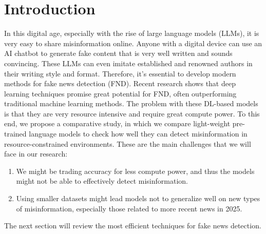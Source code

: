 \documentclass{article}
\begin{document}
\section{Introduction}
In this digital age, especially with the rise of large language models (LLMs), it is very easy to share misinformation online. Anyone with a digital device can use an AI chatbot to generate fake content that is very well written and sounds convincing. These LLMs can even imitate established and renowned authors in their writing style and format. Therefore, it's essential to develop modern methods for fake news detection (FND). Recent research shows that deep learning techniques promise great potential for FND, often outperforming traditional machine learning methods. The problem with these DL-based models is that they are very resource intensive and require great compute power. To this end, we propose a comparative study, in which we compare light-weight pre-trained language models to check how well they can detect misinformation in resource-constrained environments. These are the main challenges that we will face in our research:
\begin{enumerate}
    \item We might be trading accuracy for less compute power, and thus the models might not be able to effectively detect misinformation.
    \item Using smaller datasets might lead models not to generalize well on new types of misinformation, especially those related to more recent news in 2025.
\end{enumerate}
The next section will review the most efficient techniques for fake news detection.
\end{document}
